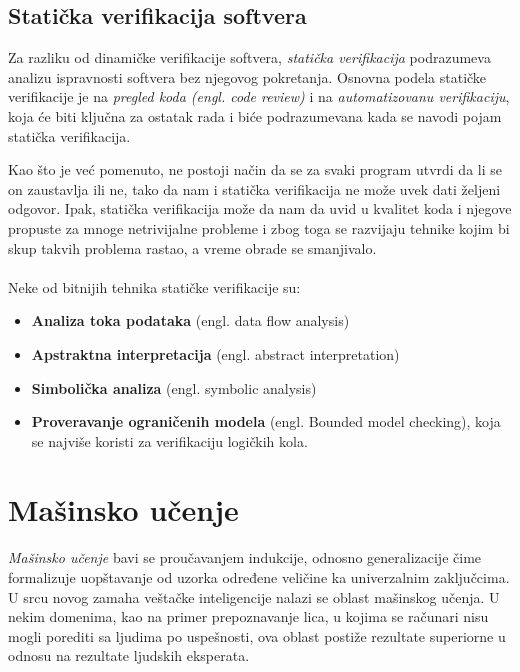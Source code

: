 \documentclass[a4paper]{article}
\begin{document}
\subsection{Statička verifikacija softvera}
\label{subsec:staticka}

\par Za razliku od dinamičke verifikacije softvera, \textit{statička verifikacija} podrazumeva analizu ispravnosti softvera bez njegovog pokretanja. Osnovna podela statičke verifikacije je na \textit{pregled koda (engl. code review)} i na \textit{automatizovanu verifikaciju}, koja će biti ključna za ostatak rada i biće podrazumevana kada se navodi pojam statička verifikacija.

\par Kao što je već pomenuto, ne postoji način da se za svaki program utvrdi da li se on zaustavlja ili ne, tako da nam i statička verifikacija ne može uvek dati željeni odgovor. Ipak, statička verifikacija može da nam da uvid u kvalitet koda i njegove propuste za mnoge netrivijalne probleme i zbog toga se razvijaju tehnike kojim bi skup takvih problema rastao, a vreme obrade se smanjivalo. 
\\\\

Neke od bitnijih tehnika statičke verifikacije su:
\begin{itemize}
\item \textbf{Analiza toka podataka} (engl. data flow analysis)
\item \textbf{Apstraktna interpretacija} (engl. abstract interpretation)
\item \textbf{Simbolička analiza} (engl. symbolic analysis)
\item \textbf{Proveravanje ograničenih modela} (engl. Bounded model checking), koja se najviše koristi za verifikaciju logičkih kola.
\end{itemize}


\section{Mašinsko učenje}



\textit{Mašinsko učenje} bavi se proučavanjem indukcije, odnosno generalizacije 
čime formalizuje uopštavanje od uzorka određene veličine ka univerzalnim zaključcima. 
U srcu novog zamaha veštačke inteligencije nalazi se oblast mašinskog učenja. 
U nekim domenima, kao na primer prepoznavanje lica, u kojima se računari nisu 
mogli porediti sa ljudima po uspešnosti, ova oblast postiže rezultate superiorne 
u odnosu na rezultate ljudskih eksperata.
\end{document}
